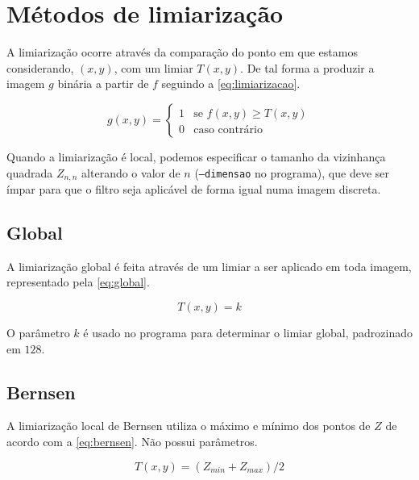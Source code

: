 \documentclass[brazilian,a4paper,twocolumn]{article}
\begin{document}
\section{Métodos de limiarização}

    A limiarização ocorre através da comparação do ponto em que estamos considerando, $(x, y)$, com um limiar $T(x, y)$. De tal forma a produzir a imagem $g$ binária a partir de $f$ seguindo a \cref{eq:limiarizacao}.

    \begin{equation}
    \label{eq:limiarizacao}
        g(x, y) =
        \begin{cases}
            1       & \text{se $f(x, y) \geq T(x, y)$} \\
            0       & \text{caso contrário}
        \end{cases}
    \end{equation}

    Quando a limiarização é local, podemos especificar o tamanho da vizinhança quadrada $Z_{n,n}$ alterando o valor de $n$ (\texttt{--dimensao} no programa), que deve ser ímpar para que o filtro seja aplicável de forma igual numa imagem discreta.

    \subsection{Global}

        A limiarização global é feita através de um limiar a ser aplicado em toda imagem, representado pela \cref{eq:global}.

        \begin{equation}
        \label{eq:global}
            T(x, y) = k
        \end{equation}

        O parâmetro $k$ é usado no programa para determinar o limiar global, padrozinado em $128$.

    \subsection{Bernsen}

        A limiarização local de Bernsen utiliza o máximo e mínimo dos pontos de $Z$ de acordo com a \cref{eq:bernsen}. Não possui parâmetros.

        \begin{equation}
        \label{eq:bernsen}
            T(x, y) = (Z_{min} + Z_{max}) / 2
        \end{equation}
\end{document}
